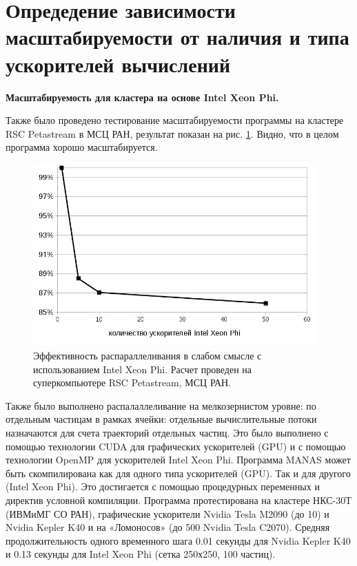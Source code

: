 \clearpage       
        
        \section{Опредедение зависимости масштабируемости от наличия и типа ускорителей вычислений}
        
        \textbf{Масштабируемость для кластера на основе Intel Xeon Phi.} 
        
       Также было проведено тестирование масштабируемости программы на кластере RSC Petastream в МСЦ РАН, результат показан на рис. \ref{phi100}. Видно, что в целом программа хорошо масштабируется.
        
        \begin{figure}[htb]
        	\begin{center}
        		\includegraphics[height=7cm,keepaspectratio]{images/petastream_phi100.jpg}
        	\end{center}
        	\caption{Эффективность распараллеливания в слабом смысле с использованием Intel Xeon Phi. Расчет проведен на суперкомпьютере RSC Petastream, МСЦ РАН.}
        	\label{phi100}
        \end{figure}
        
        Также было выполнено распалаллеливание на мелкозернистом уровне: по отдельным частицам в рамках ячейки: отдельные вычислительные потоки назначаются для счета траекторий отдельных частиц. Это было выполнено с помощью технологии CUDA для графических ускорителей (GPU) и с помощью технологии OpenMP для ускорителей Intel Xeon Phi. Программа MANAS может быть скомпилирована как для одного типа ускорителей (GPU). Так и для другого (Intel Xeon Phi). Это достигается с помощью процедурных переменных и директив условной компиляции. Программа протестирована на кластере НКС-30Т (ИВМиМГ СО РАН), графические ускорители Nvidia Tesla M2090 (до 10) и Nvidia Kepler K40 и на «Ломоносов»  (до 500 Nvidia Tesla C2070). Средняя продолжительность одного временного шага 0.01 секунды для  Nvidia Kepler K40 и 0.13 секунды для  Intel Xeon Phi (сетка 250х250, 100 частиц).
        
